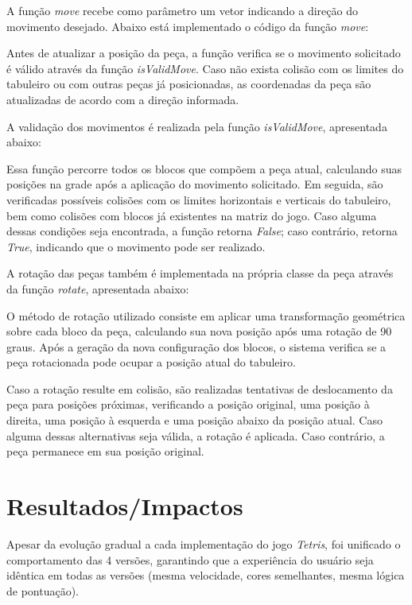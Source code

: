 A função \textit{move} recebe como parâmetro um vetor indicando a direção do movimento desejado. Abaixo está implementado o código da função \textit{move}:



Antes de atualizar a posição da peça, a função verifica se o movimento solicitado é válido através da função \textit{isValidMove}. Caso não exista colisão com os limites do tabuleiro ou com outras peças já posicionadas, as coordenadas da peça são atualizadas de acordo com a direção informada.

A validação dos movimentos é realizada pela função \textit{isValidMove}, apresentada abaixo:



Essa função percorre todos os blocos que compõem a peça atual, calculando suas posições na grade após a aplicação do movimento solicitado. Em seguida, são verificadas possíveis colisões com os limites horizontais e verticais do tabuleiro, bem como colisões com blocos já existentes na matriz do jogo. Caso alguma dessas condições seja encontrada, a função retorna \textit{False}; caso contrário, retorna \textit{True}, indicando que o movimento pode ser realizado.

A rotação das peças também é implementada na própria classe da peça através da função \textit{rotate}, apresentada abaixo:



O método de rotação utilizado consiste em aplicar uma transformação geométrica sobre cada bloco da peça, calculando sua nova posição após uma rotação de 90 graus. Após a geração da nova configuração dos blocos, o sistema verifica se a peça rotacionada pode ocupar a posição atual do tabuleiro.

Caso a rotação resulte em colisão, são realizadas tentativas de deslocamento da peça para posições próximas, verificando a posição original, uma posição à direita, uma posição à esquerda e uma posição abaixo da posição atual. Caso alguma dessas alternativas seja válida, a rotação é aplicada. Caso contrário, a peça permanece em sua posição original.

\section{Resultados/Impactos}
Apesar da evolução gradual a cada implementação do jogo \textit{Tetris}, foi unificado o comportamento das 4 versões, garantindo que a experiência do usuário seja idêntica em todas as versões (mesma velocidade, cores semelhantes, mesma lógica de pontuação). 

